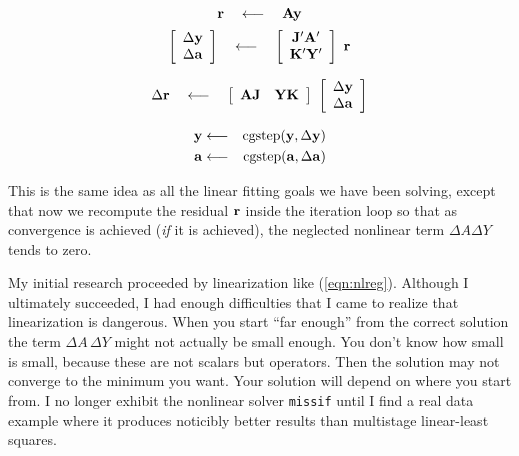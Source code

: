 \begin{equation}
 \bold r 
 \quad\longleftarrow\quad
 \bold A \bold y 
\label{eqn:progfirst}
\end{equation}
\begin{equation}
        \left[
        \begin{array}{c}
        \Delta \bold y \\
        \Delta \bold a
        \end{array}
        \right]
 \quad\longleftarrow\quad
        \left[
        \begin{array}{c}
        \bold J' \bold A' \\
        \bold K' \bold Y'
        \end{array}
        \right]
        \
        \bold r
\end{equation}

\begin{equation}
 \Delta \bold r
 \quad\longleftarrow\quad
 \left[
 \begin{array}{cc}
   \bold A \bold J   &   \bold Y \bold K 
 \end{array}
 \right]
 \
 \left[
 \begin{array}{c}
   \Delta \bold y \\
   \Delta \bold a
 \end{array}
 \right]
\end{equation}

\begin{eqnarray}
\bold y &\longleftarrow& {\rm cgstep}( \bold y, \Delta \bold y) \\ 
\bold a &\longleftarrow& {\rm cgstep}( \bold a, \Delta \bold a)
\label{eqn:proglast}
\end{eqnarray}
\par\noindent
This is the same idea as all the linear fitting goals we have been solving,
except that now we recompute
the residual $\bold r$ inside the iteration loop
so that as convergence is achieved ({\it if} it is achieved),
the neglected nonlinear term $\Delta A \Delta Y$ tends to zero.

\par
My initial research proceeded by linearization like (\ref{eqn:nlreg}).
Although I ultimately succeeded,
I had enough difficulties that
I came to realize that linearization is dangerous.
When you start ``far enough'' from the correct solution
the term $ \Delta A\, \Delta Y $
might not actually be small enough.
You don't know how small is small,
because these are not scalars but operators.
Then the solution may not converge to the minimum you want.
Your solution will depend on where you start from.
I no longer exhibit the nonlinear solver \texttt{missif}
until I find a real data example where it produces noticibly better results
than multistage linear-least squares.



